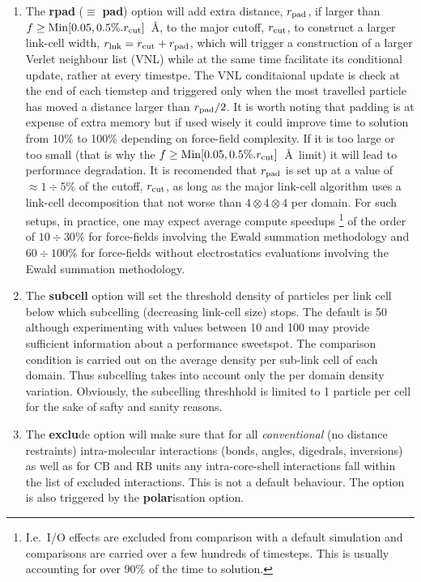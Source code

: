 \begin{enumerate}
\item The {\bf rpad} ($\equiv$ {\bf pad}) option will add extra distance,
$r_{\rm pad}$, if larger than $f \ge {\rm Min}[0.05,0.5\%.r_{\rm cut}]$~\AA,
to the major cutoff, $r_{\rm cut}$, to construct a larger link-cell width,
$r_{\rm lnk}=r_{\rm cut}+r_{\rm pad}$, which will trigger a construction of
a larger Verlet neighbour list (VNL) while at the same time facilitate its
conditional update, rather at every timestpe.  The VNL conditaional update
is check at the end of each tiemstep and triggered only when the most
travelled particle has moved a distance larger than $r_{\rm pad}/2$.  It is
worth noting that padding is at expense of extra memory but if used wisely
it could improve time to solution from 10\% to 100\% depending on force-field
complexity.  If it is too large or too small (that is why the
$f \ge {\rm Min}[0.05,0.5\%.r_{\rm cut}]$~\AA~limit) it will lead to
performace degradation.  It is recomended that $r_{\rm pad}$ is set up at a
value of $\approx 1 \div 5\%$ of the cutoff, $r_{\rm cut}$, as long as the
major link-cell algorithm uses a link-cell decomposition that not worse than
$4 \otimes 4 \otimes 4$ per domain.  For such setups, in practice, one
may expect average compute speedups \footnote{I.e.~I/O effects are excluded
from comparison with a default simulation and comparisons are carried over
a few hundreds of timesteps.  This is usually accounting for over $90\%$ of
the time to solution.} of the order of $10 \div 30\%$ for force-fields
involving the Ewald summation methodology and $60 \div 100\%$ for force-fields
without electrostatics evaluations involving the Ewald summation methodology.

\item The {\bf subcell} option will set the threshold density of particles
per link cell below which subcelling (decreasing link-cell size) stops.  The
default is 50 although experimenting with values between 10 and 100 may
provide sufficient information about a performance sweetspot.  The comparison
condition is carried out on the average density per sub-link cell of each
domain.  Thus subcelling takes into account only the per domain density
variation.  Obviously, the subcelling threshhold is limited to 1 particle per
cell for the sake of safty and sanity reasons.

\item The {\bf exclu}de option will make sure that for all {\em conventional}
(no distance restraints) intra-molecular interactions (bonds, angles,
digedrals, inversions) as well as for CB and RB units any intra-core-shell
interactions fall within the list of excluded interactions.  This is not
a default behaviour.  The option is also triggered by the {\bf polar}isation
option.
\end{enumerate}

